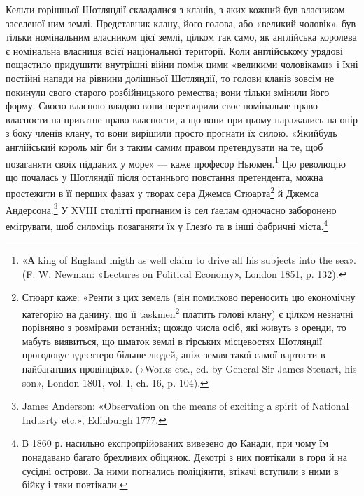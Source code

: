 Кельти горішньої Шотляндії складалися з кланів, з яких кожний був власником заселеної ним землі.
Представник клану, його голова, або «великий чоловік», був тільки номінальним власником цієї землі,
цілком так само, як англійська королева є номінальна власниця всієї національної території. Коли
англійському урядові пощастило придушити внутрішні війни поміж цими «великими чоловіками» і їхні
постійні напади на рівнини долішньої Шотляндії, то голови кланів зовсім не покинули свого старого
розбійницького ремества; вони тільки змінили його форму. Своєю власною владою вони перетворили своє
номінальне право власности на приватне право власности, а що вони при цьому наражались на опір з
боку членів клану, то вони вирішили просто прогнати їх силою. «Якийбудь англійський король міг би з
таким самим правом претендувати на те, щоб позаганяти своїх підданих у море» — каже професор
Ньюмен.\footnote{
«А king of England migth as well claim to drive all his subjects into the sea». (F. W. Newman:
«Lectures on Political Economy», London 1851, p. 132).
} Цю революцію що почалась у Шотляндії після останнього повстання претендента, можна
простежити в її перших фазах у творах сера Джемса Стюарта\footnote{
Стюарт каже: «Ренти з цих земель (він помилково переносить цю економічну категорію на данину, що
її taskmen\footnote*{
— васаль. Ред.
} платить голові клану) є цілком незначні порівняно з розмірами останніх; щождо числа
осіб, які живуть з оренди, то мабуть виявиться, що шматок землі в гірських місцевостях Шотляндії
прогодовує вдесятеро більше людей, аніж земля такої самої вартости в найбагатших провінціях».
(«Works etc., ed. by General Sir James Steuart, his son», London 1801, vol. I, ch. 16, p. 104).
} й Джемса Андерсона.\footnote{
James Anderson: «Observation on the means of exciting a spirit of National Indusrty etc.»,
Edinburgh 1777.
} У XVIII столітті
прогнаним із сел ґаелам одночасно заборонено еміґрувати,
шоб силоміць позаганяти їх у Ґлезґо та в інші фабричні міста.\footnote{
В 1860 р. насильно експропрійованих вивезено до Канади, при
чому їм понадавано багато брехливих обіцянок. Декотрі з них повтікали
в гори й на сусідні острови. За ними погнались поліціянти, втікачі вступили
з ними в бійку і таки повтікали.
}
